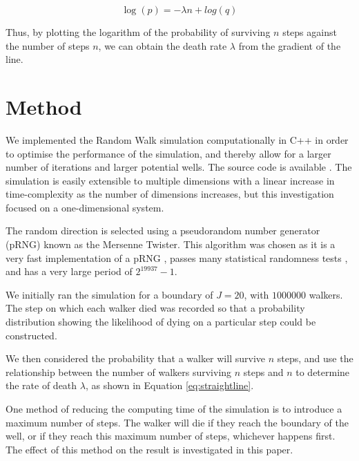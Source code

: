 \documentclass[journal]{IEEEtran}
\begin{document}
\begin{equation}
  \log(p) = -\lambda n + log(q)
  \label{eq:straightline}
\end{equation}

Thus, by plotting the logarithm of the probability of surviving $n$ steps
against the number of steps $n$, we can obtain the death rate $\lambda$ from the
gradient of the line.

\section{Method}
We implemented the Random Walk simulation computationally in
C++ in order to optimise the performance of the simulation, and thereby allow
for a larger number of iterations and larger potential wells. The source code is
available \cite{Pandian}. The simulation is easily extensible to multiple
dimensions with a linear increase in time-complexity as the number of dimensions
increases, but this investigation focused on a one-dimensional system.

The random direction is selected using a pseudorandom number generator (pRNG)
known as the Mersenne Twister. This algorithm was chosen as it is a very fast
implementation of a pRNG \cite{Route2017}, passes many statistical randomness
tests \cite{Bellamy2013}, and has a very large period of $2^{19937}-1$.

We initially ran the simulation for a boundary of $J = 20$, with $1000000$
walkers. The step on which each walker died was recorded so that a probability
distribution showing the likelihood of dying on a particular step could be
constructed.

We then considered the probability that a walker will survive $n$ steps, and use
the relationship between the number of walkers surviving $n$ steps and $n$ to
determine the rate of death $\lambda$, as shown in Equation \ref{eq:straightline}.

One method of reducing the computing time of the simulation is to introduce a
maximum number of steps. The walker will die if they reach the boundary of the
well, or if they reach this maximum number of steps, whichever happens
first. The effect of this method on the result is investigated in this paper.

\end{document}
